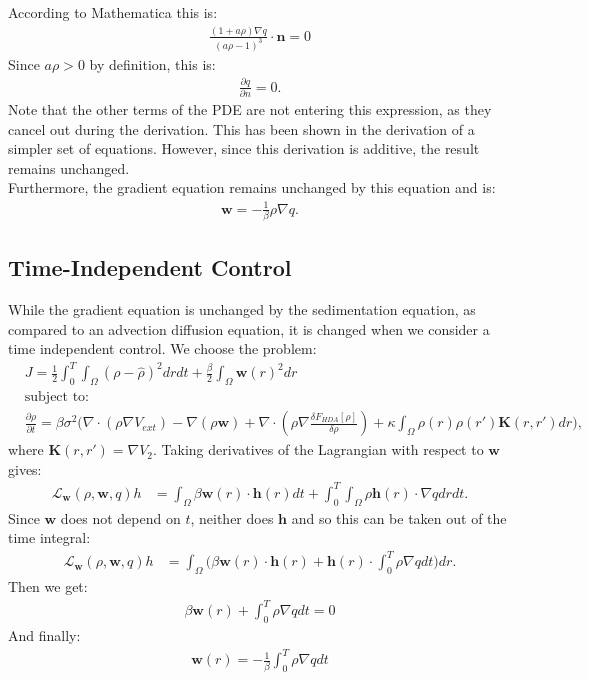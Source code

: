 \documentclass[11pt, a4paper]{article}
\theoremstyle{definition}
\newcommand{\w}{\mathbf{w}}
\newcommand{\n}{\mathbf{n}}
\newcommand{\h}{\mathbf{h}}
\newcommand{\K}{\mathbf{K}}
\begin{document}
According to Mathematica this is:
\begin{align*}
	\frac{(1 + a \rho) \nabla q}{(a \rho -1)^3}\cdot \n = 0
\end{align*}
Since $a \rho >0$ by definition, this is:
\begin{align*}
	\frac{\partial q}{\partial n} = 0.
\end{align*}
Note that the other terms of the PDE are not entering this expression, as they cancel out during the derivation. This has been shown in the derivation of a simpler set of equations. However, since this derivation is additive, the result remains unchanged.\\
Furthermore, the gradient equation remains unchanged by this equation and is:
\begin{align*}
	\w = - \frac{1}{\beta}\rho \nabla q.
\end{align*}
\subsection{Time-Independent Control}
While the gradient equation is unchanged by the sedimentation equation, as compared to an advection diffusion equation, it is changed when we consider a time independent control.
We choose the problem:
\begin{align*}
	&J = \frac{1}{2}\int_0^T \int_\Omega (\rho - \widehat \rho)^2 dr dt + \frac{\beta}{2} \int_\Omega \w(r)^2 dr\\
	&\text{subject to:}\\
	&\frac{\partial \rho}{\partial t} = \beta \sigma^2 \bigg( \nabla \cdot (\rho \nabla V_{ext}) - \nabla (\rho \w) + \nabla \cdot \left(\rho \nabla \frac{\delta F_{HDA}[\rho]}{\delta \rho}\right) + \kappa \int_\Omega \rho(r) \rho(r') \K(r,r')dr\bigg),
\end{align*}
where $\K(r,r') = \nabla V_2$.
Taking derivatives of the Lagrangian with respect to $\w$ gives:
\begin{align*}
	\mathcal{L}_\w(\rho,\w, q)h &= \int_\Omega \beta \w(r) \cdot \h(r) dt + \int_0^T \int_\Omega \rho \h(r) \cdot \nabla q dr dt.
\end{align*}
Since $\w$ does not depend on $t$, neither does $\h$ and so this can be taken out of the time integral:
\begin{align*}
	\mathcal{L}_\w(\rho,\w, q)h &= \int_\Omega \bigg( \beta \w(r) \cdot \h(r)  + \h(r) \cdot \int_0^T \rho  \nabla q dt \bigg) dr.
\end{align*}
Then we get:
\begin{align*}
	\beta \w(r)  +  \int_0^T \rho  \nabla q dt = 0
\end{align*}
And finally:
\begin{align*}
	\w(r) = - \frac{1}{\beta} \int_0^T \rho  \nabla q dt
\end{align*}
\end{document}
